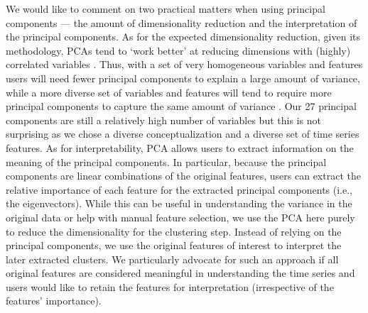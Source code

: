 We would like to comment on two practical matters when using principal
components --- the amount of dimensionality reduction and the
interpretation of the principal components. As for the expected
dimensionality reduction, given its methodology, PCAs tend to `work
better' at reducing dimensions with (highly) correlated variables
\citep[e.g.,][]{jolliffe2002}. Thus, with a set of very homogeneous
variables and features users will need fewer principal components to
explain a large amount of variance, while a more diverse set of
variables and features will tend to require more principal components to
capture the same amount of variance \citep[e.g.,][]{abdi2010}. Our 27
principal components are still a relatively high number of variables but
this is not surprising as we chose a diverse conceptualization and a
diverse set of time series features. As for interpretability, PCA allows
users to extract information on the meaning of the principal components.
In particular, because the principal components are linear combinations
of the original features, users can extract the relative importance of
each feature for the extracted principal components (i.e., the
eigenvectors). While this can be useful in understanding the variance in
the original data or help with manual feature selection, we use the PCA
here purely to reduce the dimensionality for the clustering step.
Instead of relying on the principal components, we use the original
features of interest to interpret the later extracted clusters. We
particularly advocate for such an approach if all original features are
considered meaningful in understanding the time series and users would
like to retain the features for interpretation (irrespective of the
features' importance).
